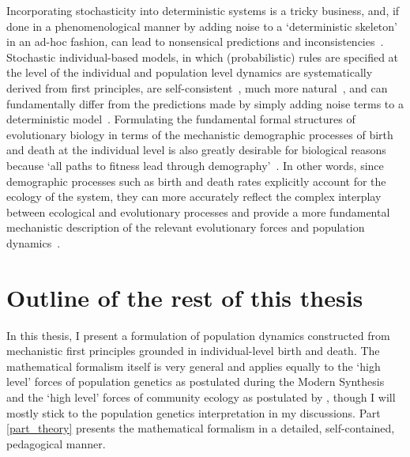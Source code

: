 Incorporating stochasticity into deterministic systems is a tricky business, and, if done in a phenomenological manner by adding noise to a `deterministic skeleton'~\citep{coulson_skeletons_2004} in an ad-hoc fashion, can lead to nonsensical predictions and inconsistencies~\citep{strang_how_2019}. Stochastic individual-based models, in which (probabilistic) rules are specified at the level of the individual and population level dynamics are systematically derived from first principles, are self-consistent~\citep{strang_how_2019}, much more natural~\citep{black_stochastic_2012}, and can fundamentally differ from the predictions made by simply adding noise terms to a deterministic model~\citep{strang_how_2019}. Formulating the fundamental formal structures of evolutionary biology in terms of the mechanistic demographic processes of birth and death at the individual level is also greatly desirable for biological reasons~\citep{metcalf_why_2007,geritz_mathematical_2012} because `all paths to fitness lead through demography'~\citep{metcalf_all_2007}. In other words, since demographic processes such as birth and death rates explicitly account for the ecology of the system, they can more accurately reflect the complex interplay between ecological and evolutionary processes and provide a more fundamental mechanistic description of the relevant evolutionary forces and population dynamics~\citep{doebeli_towards_2017}. 

\section{Outline of the rest of this thesis}

In this thesis, I present a formulation of population dynamics constructed from mechanistic first principles grounded in individual-level birth and death. The mathematical formalism itself is very general and applies equally to the `high level' forces of population genetics as postulated during the Modern Synthesis and the `high level' forces of community ecology as postulated by \cite{vellend_theory_2016}, though I will mostly stick to the population genetics interpretation in my discussions. Part \ref{part_theory} presents the mathematical formalism in a detailed, self-contained, pedagogical manner.

